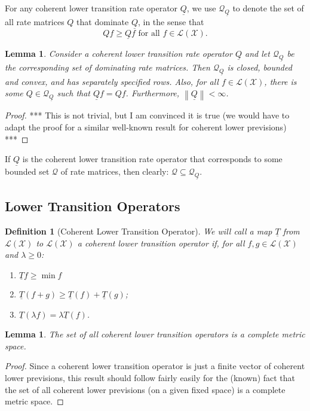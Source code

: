 \documentclass[10pt]{paper}
\newtheorem{lemma}[theorem]{Lemma}
\newtheorem{definition}{Definition}
\newcommand{\states}{\mathcal{X}}
\newcommand{\lt}{\underline{T}}
\newcommand{\gambles}{\mathcal{L}}
\newcommand{\gamblesX}{\gambles(\states)}
\newcommand{\rateset}{\mathcal{Q}}
\newcommand{\lrate}{\underline{Q}}
\newcommand{\norm}[1]{\left\lVert #1 \right\rVert}
\begin{document}
For any coherent lower transition rate operator $\lrate$, we use $\rateset_{\lrate}$ to denote the set of all rate matrices $Q$ that dominate $\lrate$, in the sense that
\begin{equation*}
Qf\geq\lrate f\text{ for all $f\in\gamblesX$.}
\end{equation*}

\begin{lemma}
Consider a coherent lower transition rate operator $\lrate$ and let $\rateset_{\lrate}$ be the corresponding set of dominating rate matrices. Then $\rateset_{\lrate}$ is closed, bounded and convex, and has separately specified rows. Also, for all $f\in\gamblesX$, there is some $Q\in\rateset_{\lrate}$ such that $\lrate f=Qf$. Furthermore, $\norm{\lrate}<\infty$.
\end{lemma}
\begin{proof}
*** This is not trivial, but I am convinced it is true (we would have to adapt the proof for a similar well-known result for coherent lower previsions) ***
\end{proof}

\noindent
If $\lrate$ is the coherent lower transition rate operator that corresponds to some bounded set $\rateset$ of rate matrices, then clearly: $\rateset\subseteq\rateset_{\lrate}$.

\subsection{Lower Transition Operators}

\begin{definition}[Coherent Lower Transition Operator]\label{def:coh_low_trans}
We will call a map $\lt$ from $\gamblesX$ to $\gamblesX$ a \emph{coherent lower transition operator} if, for all $f,g\in\gamblesX$ and $\lambda\geq0$:

\vspace{5pt}
\begin{enumerate}[label=C\arabic*:]
\item
$\lt f\geq\min f$
\item
$\lt(f+g)\geq\lt(f)+\lt(g)$;
\item
$\lt(\lambda f)=\lambda\lt(f)$.
\end{enumerate}
\vspace{5pt}
\end{definition}

\begin{lemma}\label{lemma:completemetricspace}
The set of all coherent lower transition operators is a complete metric space.
\end{lemma}
\begin{proof}
Since a coherent lower transition operator is just a finite vector of coherent lower previsions, this result should follow fairly easily for the (known) fact that the set of all coherent lower previsions (on a given fixed space) is a complete metric space.
\end{proof}
\end{document}
